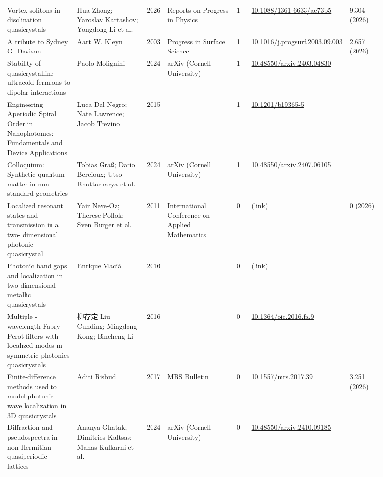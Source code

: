 \documentclass[10pt,a4paper]{article}
\begin{document}
{\begin{longtable}{p{0.192\linewidth}p{0.192\linewidth}p{0.043\linewidth}p{0.192\linewidth}p{0.043\linewidth}p{0.132\linewidth}p{0.096\linewidth}}
Vortex solitons in disclination quasicrystals & Hua Zhong; Yaroslav Kartashov; Yongdong Li et al. & 2026 & Reports on Progress in Physics & 1 & \href{https://doi.org/10.1088/1361-6633/ae73b5}{10.1088/1361-6633/ae73b5} & 9.304 (2026) \\
A tribute to Sydney G. Davison & Aart W. Kleyn & 2003 & Progress in Surface Science & 1 & \href{https://doi.org/10.1016/j.progsurf.2003.09.003}{10.1016/j.progsurf.2003.09.003} & 2.657 (2026) \\
Stability of quasicrystalline ultracold fermions to dipolar interactions & Paolo Molignini & 2024 & arXiv (Cornell University) & 1 & \href{https://doi.org/10.48550/arxiv.2403.04830}{10.48550/arxiv.2403.04830} &  \\
Engineering Aperiodic Spiral Order in Nanophotonics: Fundamentals and Device Applications & Luca Dal Negro; Nate Lawrence; Jacob Trevino & 2015 &  & 1 & \href{https://doi.org/10.1201/b19365-5}{10.1201/b19365-5} &  \\
Colloquium: Synthetic quantum matter in non-standard geometries & Tobias Graß; Dario Bercioux; Utso Bhattacharya et al. & 2024 & arXiv (Cornell University) & 1 & \href{https://doi.org/10.48550/arxiv.2407.06105}{10.48550/arxiv.2407.06105} &  \\
Localized resonant states and transmission in a two- dimensional photonic quasicrystal & Yair Neve-Oz; Therese Pollok; Sven Burger et al. & 2011 & International Conference on Applied Mathematics & 0 & \href{https://openalex.org/W135497521}{(link)} & 0 (2026) \\
Photonic band gaps and localization in two-dimensional metallic quasicrystals & Enrique Maciá & 2016 &  & 0 & \href{https://openalex.org/W2560550406}{(link)} &  \\
Multiple -wavelength Fabry-Perot filters with localized modes in symmetric photonics quasicrystals & 柳存定 Liu Cunding; Mingdong Kong; Bincheng Li & 2016 &  & 0 & \href{https://doi.org/10.1364/oic.2016.fa.9}{10.1364/oic.2016.fa.9} &  \\
Finite-difference methods used to model photonic wave localization in 3D quasicrystals & Aditi Risbud & 2017 & MRS Bulletin & 0 & \href{https://doi.org/10.1557/mrs.2017.39}{10.1557/mrs.2017.39} & 3.251 (2026) \\
Diffraction and pseudospectra in non-Hermitian quasiperiodic lattices & Ananya Ghatak; Dimitrios Kaltsas; Manas Kulkarni et al. & 2024 & arXiv (Cornell University) & 0 & \href{https://doi.org/10.48550/arxiv.2410.09185}{10.48550/arxiv.2410.09185} &  \\

\end{longtable}}
\end{document}
